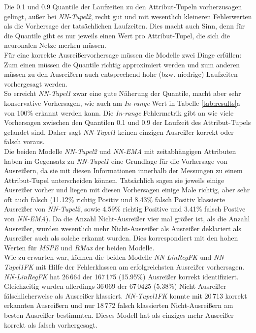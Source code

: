 \documentclass[
	twoside,
	12pt,
	a4paper,
	BCOR10mm,
	DIV14,
	listof=totoc,
	bibliography=totoc,
	headsepline
]{scrreprt}
\begin{document}
Die 0.1 und 0.9 Quantile der Laufzeiten zu den Attribut-Tupeln vorherzusagen gelingt, außer bei \textit{NN-Tupel2}, recht gut und mit wesentlich kleineren Fehlerwerten als die Vorhersage der tatsächlichen Laufzeiten.
Dies macht auch Sinn, denn für die Quantile gibt es nur jeweils einen Wert pro Attribut-Tupel, die sich die neuronalen Netze \glqq merken \grqq{}müssen.\\
Für eine korrekte Ausreißervorhersage müssen die Modelle zwei Dinge erfüllen:\\
Zum einen müssen die Quantile richtig approximiert werden und zum anderen müssen zu den Ausreißern auch entsprechend hohe (bzw. niedrige) Laufzeiten vorhergesagt werden.\\
So erreicht \textit{NN-Tupel1} zwar eine gute Näherung der Quantile, macht aber sehr konservative Vorhersagen, wie auch am \textit{In-range}-Wert in Tabelle \ref{tab:results}a von 100\% erkannt werden kann.
Die \textit{In-range} Fehlermetrik gibt an wie viele Vorhersagen zwischen den Quantilen 0.1 und 0.9 der Laufzeit des Attribut-Tupels gelandet sind.
 Daher sagt \textit{NN-Tupel1} keinen einzigen Ausreißer korrekt oder falsch voraus.\\
Die beiden Modelle \textit{NN-Tupel2} und \textit{NN-EMA} mit zeitabhängigen Attributen haben im Gegensatz zu \textit{NN-Tupel1} eine Grundlage für die Vorhersage von Ausreißern, da sie mit diesen Informationen innerhalb der Messungen zu einem Attribut-Tupel unterscheiden können.
Tatsächlich sagen sie jeweils einige Ausreißer vorher und liegen mit diesen Vorhersagen einige Male richtig, aber sehr oft auch falsch (11.12\% richtig Positiv und 8.43\% falsch Positiv klassierte Ausreißer von \textit{NN-Tupel2}, sowie 4.59\% richtig Positive und 3.41\% falsch Postive von \textit{NN-EMA}).
Da die Anzahl Nicht-Ausreißer vier mal größer ist, als die Anzahl Ausreißer, wurden wesentlich mehr Nicht-Ausreißer als Ausreißer deklariert als Ausreißer auch als solche erkannt wurden. Dies korrespondiert mit den hohen Werten für \textit{MSPE} und \textit{RMax} der beiden Modelle.\\
Wie zu erwarten war, können die beiden Modelle \textit{NN-LinRegFK} und \textit{NN-Tupel1FK} mit Hilfe der Fehlerklassen am erfolgreichsten Ausreißer vorhersagen. 
\textit{NN-LinRegFK} hat 26\,664 der 167\,175 (15.95\%) Ausreißer korrekt identifiziert.
Gleichzeitig wurden allerdings 36\,069 der 67\,0425 (5.38\%) Nicht-Ausreißer fälschlicherweise als Ausreißer klassiert.
\textit{NN-Tupel1FK} konnte mit 20\,713 korrekt erkannten Ausreißern und nur 18\,772 falsch klassierten Nicht-Ausreißern am besten Ausreißer bestimmten. Dieses Modell hat als einziges mehr Ausreißer korrekt als falsch vorhergesagt.\medskip
\end{document}
